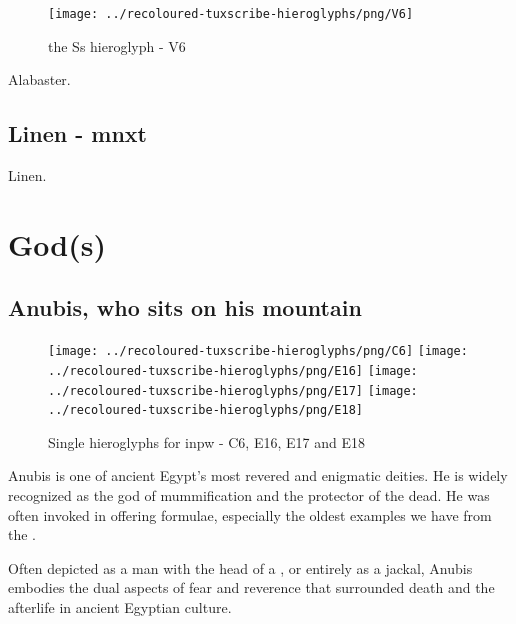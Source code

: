 \begin{figure} [H]
	\centering
	\texttt{[image: ../recoloured-tuxscribe-hieroglyphs/png/V6]}
	\caption{the Ss hieroglyph - V6}
\end{figure}

Alabaster.

\subsection*{Linen - mnxt}

Linen.

\section*{God(s)}

\subsection*{Anubis, who sits on his mountain}

\begin{figure} [H]
	\centering
	\texttt{[image: ../recoloured-tuxscribe-hieroglyphs/png/C6]}
	\hspace{0.03125\textwidth}
	\texttt{[image: ../recoloured-tuxscribe-hieroglyphs/png/E16]}
	\texttt{[image: ../recoloured-tuxscribe-hieroglyphs/png/E17]}
	\texttt{[image: ../recoloured-tuxscribe-hieroglyphs/png/E18]}
	\caption{Single hieroglyphs for inpw - C6, E16, E17 and E18}
\end{figure}

Anubis is one of ancient Egypt's most revered and enigmatic deities. He is widely recognized as the god of mummification and the protector of the dead. He was often invoked in offering formulae, especially the oldest examples we have from the .

Often depicted as a man with the head of a , or entirely as a jackal, Anubis embodies the dual aspects of fear and reverence that surrounded death and the afterlife in ancient Egyptian culture.

